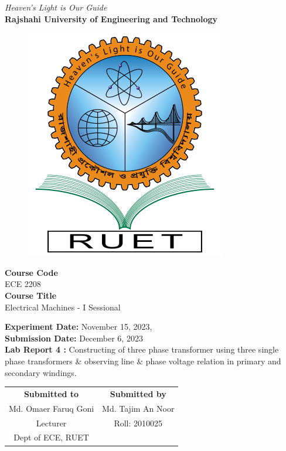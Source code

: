 \vspace*{\fill}
\begin{center}

    \emph{Heaven's Light is Our Guide} \\
    \textbf{Rajshahi University of Engineering and Technology} \\

    \begin{figure}[h]
        \centering
        \includegraphics[scale=.34]{images/RUET_logo.png}
        \label{fig:ruet_logo}
    \end{figure}
    \vspace{5mm}

    \textbf{Course Code}\\
    ECE 2208\\
    \vspace{3mm}
    \textbf{Course Title}\\
    Electrical Machines - I Sessional

    \vspace{5mm}
    \textbf{Experiment Date:} {November 15, 2023,}\\
    \textbf{Submission Date:} {December 6, 2023}\\

    \vspace{5mm}
    \textbf{Lab Report 4 :} Constructing of three phase transformer using three single phase transformers
    \& observing line \& phase voltage relation in primary and
    secondary windings.\\

    \vspace{15mm}

    \begin{tabular}{c|c}
        \textbf{Submitted to} & \textbf{Submitted by} \\
        Md. Omaer Faruq Goni  & Md. Tajim An Noor     \\
        Lecturer              & Roll: 2010025         \\
        Dept of ECE, RUET     &                       \\
    \end{tabular}

\end{center}
\vspace*{\fill}
